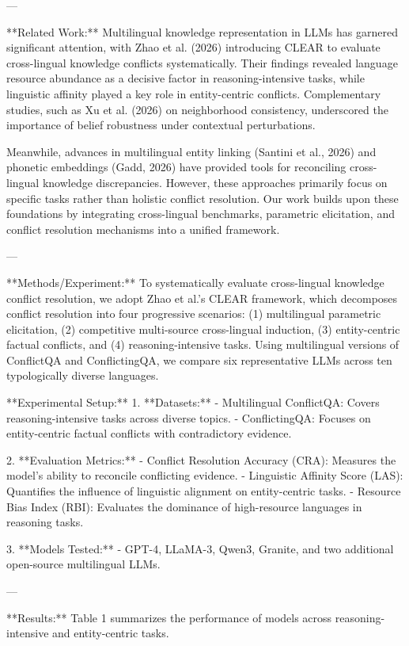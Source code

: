 ---

**Related Work:**  
Multilingual knowledge representation in LLMs has garnered significant attention, with Zhao et al. (2026) introducing CLEAR to evaluate cross-lingual knowledge conflicts systematically. Their findings revealed language resource abundance as a decisive factor in reasoning-intensive tasks, while linguistic affinity played a key role in entity-centric conflicts. Complementary studies, such as Xu et al. (2026) on neighborhood consistency, underscored the importance of belief robustness under contextual perturbations.

Meanwhile, advances in multilingual entity linking (Santini et al., 2026) and phonetic embeddings (Gadd, 2026) have provided tools for reconciling cross-lingual knowledge discrepancies. However, these approaches primarily focus on specific tasks rather than holistic conflict resolution. Our work builds upon these foundations by integrating cross-lingual benchmarks, parametric elicitation, and conflict resolution mechanisms into a unified framework.

---

**Methods/Experiment:**  
To systematically evaluate cross-lingual knowledge conflict resolution, we adopt Zhao et al.’s CLEAR framework, which decomposes conflict resolution into four progressive scenarios: (1) multilingual parametric elicitation, (2) competitive multi-source cross-lingual induction, (3) entity-centric factual conflicts, and (4) reasoning-intensive tasks. Using multilingual versions of ConflictQA and ConflictingQA, we compare six representative LLMs across ten typologically diverse languages.

**Experimental Setup:**  
1. **Datasets:**  
   - Multilingual ConflictQA: Covers reasoning-intensive tasks across diverse topics.  
   - ConflictingQA: Focuses on entity-centric factual conflicts with contradictory evidence.  

2. **Evaluation Metrics:**  
   - Conflict Resolution Accuracy (CRA): Measures the model's ability to reconcile conflicting evidence.  
   - Linguistic Affinity Score (LAS): Quantifies the influence of linguistic alignment on entity-centric tasks.  
   - Resource Bias Index (RBI): Evaluates the dominance of high-resource languages in reasoning tasks.  

3. **Models Tested:**  
   - GPT-4, LLaMA-3, Qwen3, Granite, and two additional open-source multilingual LLMs.

---

**Results:**  
Table 1 summarizes the performance of models across reasoning-intensive and entity-centric tasks.


